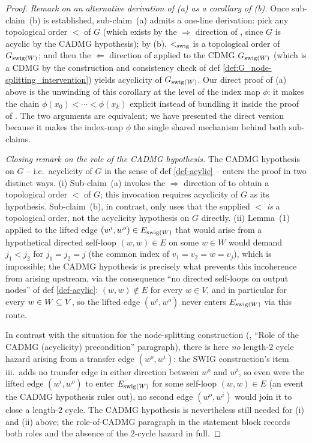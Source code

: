 \documentclass[main]{subfiles}
\begin{document}
\begin{proof}
\medskip\noindent\emph{Remark on an alternative derivation of (a) as a corollary of (b).}
Once sub-claim~(b) is established, sub-claim~(a) admits a one-line derivation: pick any topological order $<$ of $G$ (which exists by the $\Rightarrow$ direction of , since $G$ is acyclic by the CADMG hypothesis); by (b), $<_{\mathrm{swig}}$ is a topological order of $G_{\mathrm{swig}(W)}$; and then the $\Leftarrow$ direction of  applied to the CDMG $G_{\mathrm{swig}(W)}$ (which is a CDMG by the construction and consistency check of def \ref{def:G_node-splitting_intervention}) yields acyclicity of $G_{\mathrm{swig}(W)}$. Our direct proof of (a) above is the unwinding of this corollary at the level of the index map $\phi$: it makes the chain $\phi(x_0) < \cdots < \phi(x_k)$ explicit instead of bundling it inside the proof of . The two arguments are equivalent; we have presented the direct version because it makes the index-map $\phi$ the single shared mechanism behind both sub-claims.

\medskip\noindent\emph{Closing remark on the role of the CADMG hypothesis.}
The CADMG hypothesis on $G$ -- i.e.\ acyclicity of $G$ in the sense of def \ref{def-acylic} -- enters the proof in two distinct ways. (i) Sub-claim~(a) invokes the $\Rightarrow$ direction of  to obtain a topological order $<$ of $G$; this invocation requires acyclicity of $G$ as its hypothesis. Sub-claim~(b), in contrast, only uses that the supplied $<$ \emph{is} a topological order, not the acyclicity hypothesis on $G$ directly. (ii) Lemma~(1) applied to the lifted edge $(w^i, w^o) \in E_{\mathrm{swig}(W)}$ that would arise from a hypothetical directed self-loop $(w, w) \in E$ on some $w \in W$ would demand $j_1 < j_2$ for $j_1 = j_2 = j$ (the common index of $v_1 = v_2 = w = v_j$), which is impossible; the CADMG hypothesis is precisely what prevents this incoherence from arising upstream, via the consequence ``no directed self-loops on output nodes'' of def \ref{def-acylic}: $(w, w) \notin E$ for every $w \in V$, and in particular for every $w \in W \subseteq V$, so the lifted edge $(w^i, w^o)$ never enters $E_{\mathrm{swig}(W)}$ via this route.

In contrast with the situation for the node-splitting construction (, ``Role of the CADMG (acyclicity) precondition'' paragraph), there is here \emph{no} length-$2$ cycle hazard arising from a transfer edge $(w^o, w^i)$: the SWIG construction's item iii.\ adds no transfer edge in either direction between $w^o$ and $w^i$, so even were the lifted edge $(w^i, w^o)$ to enter $E_{\mathrm{swig}(W)}$ for some self-loop $(w, w) \in E$ (an event the CADMG hypothesis rules out), no second edge $(w^o, w^i)$ would join it to close a length-$2$ cycle. The CADMG hypothesis is nevertheless still needed for (i) and (ii) above; the role-of-CADMG paragraph in the statement block records both roles and the absence of the 2-cycle hazard in full.
\end{proof}
\end{document}
